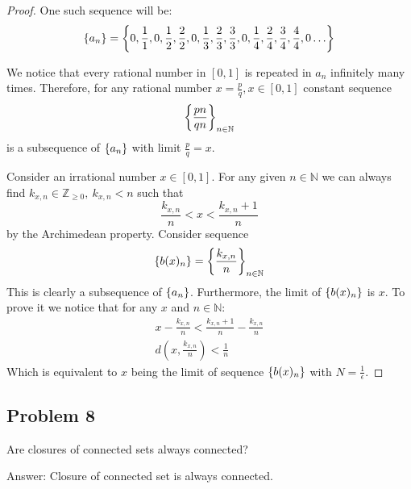 \documentclass{article}
\newcommand{\N}{\mathbb{N}}
\newcommand{\Z}{\mathbb{Z}}
\DeclarePairedDelimiter{\set}{ \{ }{ \} }
\begin{document}
\begin{proof}
One such sequence will be:
\[ \set*{ a_n } = \set*{0, \frac{1}{1}, 0, \frac{1}{2}, \frac{2}{2}, 0, \frac{1}{3}, \frac{2}{3}, \frac{3}{3}, 0, \frac{1}{4}, \frac{2}{4}, \frac{3}{4}, \frac{4}{4}, 0 \dots } \]

We notice that every rational number in $[0, 1]$ is repeated in $a_n$  infinitely many times.
Therefore, for any rational number $x = \frac{p}{q}, x \in [0, 1]$ constant sequence
\[ \set*{ \frac{pn}{qn} }_{n \in \N} \]
is a subsequence of $\set{ a_n }$ with limit $\frac{p}{q} = x$.

Consider an irrational number $x \in [0, 1]$.
For any given $n \in \N$ we can always find $k_{x, n} \in \Z_{\geq 0}, \> k_{x, n} < n$ such that
\[ \frac{k_{x, n}}{n} < x < \frac{k_{x, n}+1}{n} \]
by the Archimedean property. Consider sequence
\[ \set*{ b(x)_n } = \set*{ \frac{k_{x, n}}{n} }_{n \in \N} \]
This is clearly a subsequence of $\set{ a_n }$.
Furthermore, the limit of $\set*{ b(x)_n }$ is $x$.
To prove it we notice that for any $x$ and $n \in \N$:
\begin{gather*}
    x - \frac{k_{x, n}}{n} < \frac{k_{x, n}+1}{n} - \frac{k_{x, n}}{n} \\
    d \left( x, \frac{k_{x, n}}{n} \right) < \frac{1}{n}
\end{gather*}
Which is equivalent to $x$ being the limit of sequence $\set*{ b(x)_n }$ with $N = \frac{1}{\epsilon}$.

\end{proof}


\subsection*{Problem 8}

\begin{tcolorbox}
Are closures of connected sets always connected?
\end{tcolorbox}

Answer: Closure of connected set is always connected.
\end{document}
